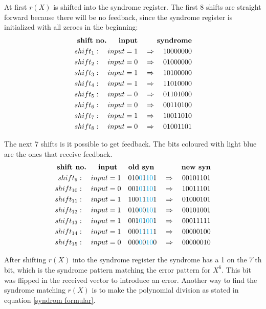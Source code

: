 \documentclass[Main]{subfiles}
\begin{document}
At first $r(X)$ is shifted into the syndrome register.
The first 8 shifts are straight forward because there will be no feedback, since the syndrome register is initialized with all zeroes in the beginning:
\begin{eqnarray*}
\textbf{shift no. \quad	input \qquad syndrome}\\
shift_1: \quad input = 1 \quad \Rightarrow \quad 10000000\\
shift_2: \quad input = 0 \quad \Rightarrow \quad 01000000\\
shift_3: \quad input = 1 \quad \Rightarrow \quad 10100000\\
shift_4: \quad input = 1 \quad \Rightarrow \quad 11010000\\
shift_5: \quad input = 0 \quad \Rightarrow \quad 01101000\\
shift_6: \quad input = 0 \quad \Rightarrow \quad 00110100\\
shift_7: \quad input = 1 \quad \Rightarrow \quad 10011010\\
shift_8: \quad input = 0 \quad \Rightarrow \quad 01001101
\end{eqnarray*}

The next 7 shifts is it possible to get feedback.
The bits coloured with light blue are the ones that receive feedback. 
\begin{eqnarray*}
\textbf{shift no. \quad	input \quad old syn \qquad \quad new syn}\\
shift_9: \quad input = 1 \quad 010{\color{cyan}0}1{\color{cyan}10}1 \quad \Rightarrow \quad 00101101\\
shift_{10}: \quad input = 0 \quad 001{\color{cyan}0}1{\color{cyan}10}1 \quad \Rightarrow \quad 10011101\\
shift_{11}: \quad input = 1 \quad 100{\color{cyan}1}1{\color{cyan}10}1 \quad \Rightarrow \quad 01000101\\
shift_{12}: \quad input = 1 \quad 010{\color{cyan}0}0{\color{cyan}10}1 \quad \Rightarrow \quad 00101001\\
shift_{13}: \quad input = 1 \quad 001{\color{cyan}0}1{\color{cyan}00}1 \quad \Rightarrow \quad 00011111\\
shift_{14}: \quad input = 1 \quad 000{\color{cyan}1}1{\color{cyan}11}1 \quad \Rightarrow \quad 00000100\\
shift_{15}: \quad input = 0 \quad 000{\color{cyan}0}0{\color{cyan}10}0 \quad \Rightarrow \quad 00000010
\end{eqnarray*}

After shifting $r(X)$ into the syndrome register the syndrome has a 1 on the 7'th bit, which is the syndrome pattern matching the error pattern for $X^6$.
This bit was flipped in the received vector to introduce an error.
Another way to find the syndrome matching $ r(X) $ is to make the polynomial division as stated in equation \ref{syndrom formular}.
\end{document}
